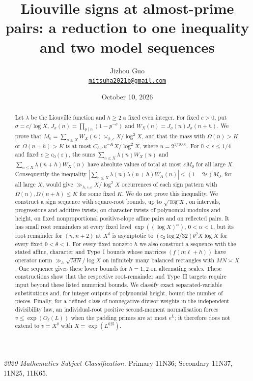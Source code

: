 \documentclass[11pt]{article}
\title{Liouville signs at almost-prime pairs: a reduction to one inequality and two model sequences}
\author{Jizhou Guo\\
  \href{mailto:mitsuha2021b@gmail.com}{\texttt{mitsuha2021b@gmail.com}}}
\date{October 10, 2026}
\theoremstyle{definition}
\theoremstyle{remark}
\numberwithin{equation}{section}
\begin{document}
\maketitle

\begin{abstract}
Let $\lambda$ be the Liouville function and $h\ge2$ a fixed even integer. For fixed $c>0$, put
$\sigma=c/\log X$, $J_\sigma(n)=\prod_{p\mid n}(1-p^{-\sigma})$ and
$W_X(n)=J_\sigma(n)J_\sigma(n+h)$. We prove that $M_0=\sum_{n\le X}W_X(n)\asymp_{h,c}X/\log^2X$,
and that the mass with $\Omega(n)>K$ or $\Omega(n+h)>K$ is at most
$C_{h,c}u^{-K}X/\log^2X$, where $u=2^{1/1000}$.
For $0<\varepsilon\le1/4$ and fixed $c\ge c_0(\varepsilon)$, the sums $\sum_{n\le X}\lambda(n)W_X(n)$ and
$\sum_{n\le X}\lambda(n+h)W_X(n)$ have absolute values of total at most $\varepsilon M_0$ for all large $X$. Consequently the inequality
$|\sum_{n\le X}\lambda(n)\lambda(n+h)W_X(n)|\le(1-2\varepsilon)M_0$, for all large $X$, would give
$\gg_{h,c,\varepsilon}X/\log^2X$ occurrences of each sign pattern with
$\Omega(n),\Omega(n+h)\le K$ for some fixed $K$. We do not prove this inequality.
We construct a sign sequence with square-root bounds, up to $\sqrt{\log X}$, on intervals,
progressions and additive twists, on character twists of polynomial modulus and height, on fixed
nonproportional positive-slope affine pairs and on reflected pairs. It has small root remainders at every
fixed level $\exp((\log X)^\alpha)$, $0<\alpha<1$, but its root remainder for $(n,n+2)$ at $X^\theta$ is
asymptotic to $(c_2\log2/32)\theta^2X\log X$ for every fixed $0<\theta<1$.
For every fixed nonzero $h$ we also construct a sequence with the stated affine, character and Type~I
bounds whose matrices $(f(m\ell+h))$ have operator norm $\gg_h\sqrt{MN}/\log X$ on infinitely many
balanced rectangles with $MN\asymp X$. One sequence gives these lower bounds for $h=1,2$ on alternating
scales. These constructions show that the respective root-remainder and Type~II targets require input beyond
these listed numerical bounds.
We classify exact separated-variable substitutions and, for integer outputs of polynomial height, bound the
number of pieces.
Finally, for a defined class of nonnegative divisor weights in the independent divisibility law, an
individual-root positive second-moment normalisation forces $v\le\exp(O_\delta(L))$ when the padding
primes are at most $e^L$; it therefore does not extend to $v=X^\theta$ with $X=\exp(L^{625})$.
\end{abstract}
\noindent\textit{2020 Mathematics Subject Classification.} Primary 11N36; Secondary 11N37, 11N25, 11K65.
\end{document}
